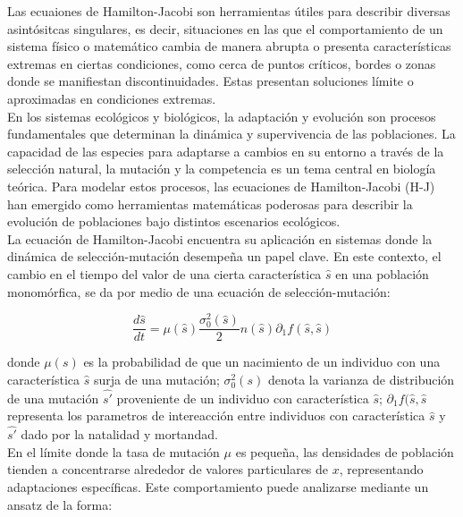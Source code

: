 {            \normalsize{\citep{Barles2006} Las ecuaiones de Hamilton-Jacobi son herramientas útiles para describir diversas asintósitcas singulares, es decir, situaciones en las que el comportamiento de un sistema físico o matemático cambia  de manera abrupta o presenta características extremas en ciertas condiciones, como cerca de puntos críticos, bordes o zonas donde se manifiestan discontinuidades. Estas presentan soluciones límite o aproximadas en condiciones extremas.
            }\\

            \normalsize{En los sistemas ecológicos y biológicos, la adaptación y evolución son procesos fundamentales que determinan la dinámica y supervivencia de las poblaciones. La capacidad de las especies para adaptarse a cambios en su entorno a través de la selección natural, la mutación y la competencia es un tema central en biología teórica. Para modelar estos procesos, las ecuaciones de Hamilton-Jacobi (H-J) han emergido como herramientas matemáticas poderosas para describir la evolución de poblaciones bajo distintos escenarios ecológicos.}\\

            \normalsize{\citep{Nicolas} La ecuación de Hamilton-Jacobi encuentra su aplicación en sistemas donde la dinámica de selección-mutación desempeña un papel clave. En este contexto, el cambio en el tiempo del valor de una cierta característica $\hat{s}$ en una población monomórfica, se da por medio de una ecuación de selección-mutación:}

            \begin{equation*}
                \frac{d \hat{s}}{d t}=\mu(\hat{s}) \frac{\sigma_0^2(\hat{s})}{2} n(\hat{s}) \partial_1 f(\hat{s}, \hat{s})
            \end{equation*}

            \normalsize{donde $\mu(s)$ es la probabilidad de que un nacimiento de un individuo con una característica $\hat{s}$ surja de una mutación; $\sigma_0^2(s)$ denota la varianza de distribución de una mutación $\hat{s'}$ proveniente de un individuo con característica $\hat{s}$; $\partial_1 f(\hat{s}, \hat{s}$ representa los parametros de intereacción entre individuos con característica $\hat{s}$ y $\hat{s'}$ dado por la natalidad y mortandad.}\\

            \normalsize{\citep{Calves} En el límite donde la tasa de mutación \( \mu \) es pequeña, las densidades de población tienden a concentrarse alrededor de valores particulares de \( x \), representando adaptaciones específicas. Este comportamiento puede analizarse mediante un ansatz de la forma:}

}
